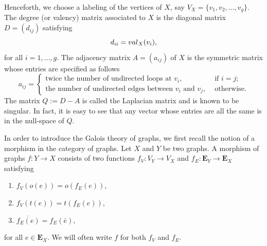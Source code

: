 \documentclass[11pt]{amsart}
\numberwithin{equation}{section}
\theoremstyle{remark}
\begin{document}
\par Henceforth, we choose a labeling of the vertices of $X$, say $V_{X} = \{v_{1},v_{2},\ldots,v_{g} \}$.  The degree (or valency) matrix associated to $X$ is the diagonal matrix $D = (d_{ij})$ satisfying 
\begin{equation} \label{degree_matrix}
d_{ii} = {\rm val}_{X}(v_{i}),
\end{equation} 
for all $i=1,\ldots,g$.  The adjacency matrix $A = (a_{ij})$ of $X$ is the symmetric matrix whose entries are specified as follows
\begin{equation} \label{adj_matrix}
a_{ij} =
\begin{cases}
\text{twice the number of undirected loops at } v_{i}, &\text{ if } i=j;\\
\text{the number of undirected edges between } v_{i} \text{ and } v_{j}, & \text{ otherwise.}
\end{cases}
\end{equation}
The matrix $Q := D - A$ is called the Laplacian matrix and is known to be singular. In fact, it is easy to see that any vector whose entries are all the same is in the null-space of $Q$.

\par In order to introduce the Galois theory of graphs, we first recall the notion of a morphism in the category of graphs. Let $X$ and $Y$ be two graphs.  A morphism of graphs $f:Y \rightarrow X$ consists of two functions $f_{V}:V_{Y} \rightarrow V_{X}$ and $f_{E}:\mathbf{E}_{Y} \rightarrow \mathbf{E}_{X}$ satisfying
\begin{enumerate}
\item $f_{V}(o(e)) = o(f_{E}(e))$,
\item $f_{V}(t(e)) = t(f_{E}(e))$,
\item $\overline{f_{E}(e)} = f_{E}(\bar{e})$, \label{trois}
\end{enumerate}
for all $e \in \mathbf{E}_{X}$.  We will often write $f$ for both $f_{V}$ and $f_{E}$.
\end{document}
